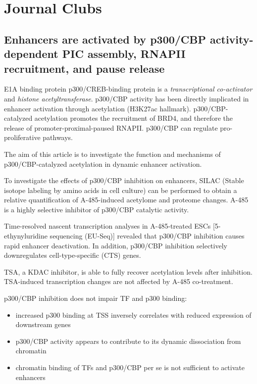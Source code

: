 \graphicspath{{chapters/_resources/}}

\chapter{Journal Clubs}

\section{Enhancers are activated by p300/CBP activity-dependent PIC assembly, RNAPII recruitment, and pause release}

E1A binding protein p300/CREB-binding protein is a \emph{transcriptional co-activator} and \emph{histone acetyltransferase}. p300/CBP activity has been directly implicated in enhancer activation through acetylation (H3K27ac hallmark). p300/CBP-catalyzed acetylation promotes the recruitment of BRD4, and therefore the release of promoter-proximal-paused RNAPII. p300/CBP can regulate pro-proliferative pathways.

The aim of this article is to investigate the function and mechanisms of p300/CBP-catalyzed acetylation in dynamic enhancer activation.

To investigate the effects of p300/CBP inhibition on enhancers, SILAC (Stable isotope labeling by amino acids in cell culture) can be performed to obtain a relative quantification of A-485-induced acetylome and proteome changes. A-485 is a highly selective inhibitor of p300/CBP catalytic activity. 

Time-resolved nascent transcription analyses in A-485-treated ESCs [5-ethynyluridine sequencing (EU-Seq)] revealed that p300/CBP inhibition causes rapid enhancer deactivation. In addition, p300/CBP inhibition selectively downregulates cell-type-specific (CTS) genes.

TSA, a KDAC inhibitor, is able to fully recover acetylation levels after inhibition. TSA-induced transcription changes are not affected by A-485 co-treatment.

p300/CBP inhibition does not impair TF and p300 binding:
\begin{itemize}
\item increased p300 binding at TSS inversely correlates with reduced expression of downstream genes
\item p300/CBP activity appears to contribute to its dynamic dissociation from chromatin
\item chromatin binding of TFs and p300/CBP per se is not sufficient to activate enhancers
\end{itemize}

